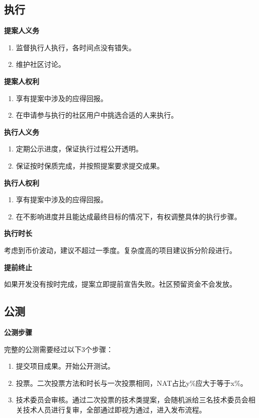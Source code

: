 \begin{enumerate}
\begin{itemize}
\end{itemize}

\textbf{}



\subsection{执行}
\textbf{提案人义务}
\begin{enumerate}
\item 监督执行人执行，各时间点没有错失。
\item 维护社区讨论。
\end{enumerate}

\textbf{提案人权利}
\begin{enumerate}
\item 享有提案中涉及的应得回报。
\item 在申请参与执行的社区用户中挑选合适的人来执行。
\end{enumerate}

\textbf{执行人义务}
\begin{enumerate}
\item 定期公示进度，保证执行过程公开透明。
\item 保证按时保质完成，并按照提案要求提交成果。
\end{enumerate}

\textbf{执行人权利}
\begin{enumerate}
\item 享有提案中涉及的应得回报。
\item 在不影响进度并且能达成最终目标的情况下，有权调整具体的执行步骤。
\end{enumerate}

\textbf{执行时长}

考虑到币价波动，建议不超过一季度。复杂度高的项目建议拆分阶段进行。

\textbf{提前终止}

如果开发没有按时完成，提案立即提前宣告失败。社区预留资金不会发放。

\subsection{公测}
\textbf{公测步骤}

完整的公测需要经过以下3个步骤：
\begin{enumerate}
\item 提交项目成果。开始公开测试。
\item 投票。二次投票方法和时长与一次投票相同，NAT占比y\%应大于等于x\%。
\item 技术委员会审核。通过二次投票的技术类提案，会随机派给三名技术委员会相关技术人员进行复审，全部通过即视为通过，进入发布流程。
\end{enumerate}


\end{enumerate}
